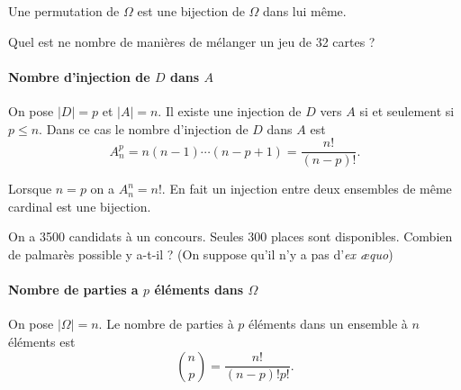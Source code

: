 \begin{remark}
	Une permutation  de $\Omega$ est une bijection de $\Omega$ dans lui même.
\end{remark}

\begin{exemple}
	Quel est ne nombre de manières de mélanger un jeu de 32 cartes ?
	\pl{\rep{3cm}}

\end{exemple}

\sld{\vfill\pagebreak[5]}%

\paragraph{Nombre d'injection de $D$ dans $A$}

On pose $|D| = p$ et $|A| = n$. Il existe une injection de $D$ vers $A$ si et seulement si $p \leq n$. Dans ce cas le nombre d'injection de $D$ dans $A$ est 
\[
	A_n^p = n(n-1) \cdots (n-p+1) = \frac{n!}{(n-p)!}.
\]
\begin{remark}
	Lorsque $n=p$ on a $A_n^n = n!$. En fait un injection entre deux ensembles de même cardinal est une bijection.
\end{remark}

\begin{exemple}
	On a 3500 candidats à un concours. Seules 300 places sont disponibles. Combien de palmarès possible y a-t-il ? (On suppose qu'il n'y a pas d'\textit{ex \ae{}quo})
	\pl{\rep{3cm}}
\end{exemple}


\sld{\vfill\pagebreak[5]}%

\paragraph{Nombre de parties a $p$ éléments dans $\Omega$} On pose $|\Omega|=n$. 
Le nombre de parties à $p$ éléments dans un ensemble à $n$ éléments est 
\[
	\binom{n}{p} =  \frac{n!}{(n-p)! p!}.
\]

